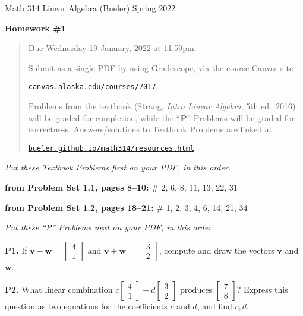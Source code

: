 \documentclass[12pt]{amsart}
\newcommand{\bv}{\mathbf{v}}
\newcommand{\bw}{\mathbf{w}}
\newcommand{\ds}{\displaystyle}
\newcommand{\prob}[1]{\bigskip\noindent\textbf{#1}\quad }
\newcommand{\probset}[2]{\prob{from Problem Set #1, pages #2:}}
\begin{document}
\scriptsize \noindent Math 314 Linear Algebra (Bueler) \hfill Spring 2022
\normalsize\medskip

\Large
\centerline{\textbf{Homework \#1}}

\normalsize
\bigskip
\begin{quote}
Due Wednesday 19 January, 2022 at 11:59pm.

\medskip
\noindent Submit as a single PDF by using Gradescope, via the course Canvas site

\href{https://canvas.alaska.edu/courses/7017}{\texttt{canvas.alaska.edu/courses/7017}}

\noindent Problems from the textbook (Strang, \emph{Intro Linear Algebra}, 5th ed.~2016) will be graded for completion, while the ``\textbf{P}'' Problems will be graded for correctness.  Answers/solutions to Textbook Problems are linked at

\href{https://bueler.github.io/math314/resources.html}{\texttt{bueler.github.io/math314/resources.html}}
\end{quote}
\medskip

\thispagestyle{empty}

\noindent \hrulefill

\noindent \emph{Put these Textbook Problems first on your PDF, in this order.}

\probset{1.1}{8--10} \# 2, 6, 8, 11, 13, 22, 31

\probset{1.2}{18--21} \# 1, 2, 3, 4, 6, 14, 21, 34

\bigskip
\noindent \hrulefill

\noindent \emph{Put these ``P'' Problems next on your PDF, in this order.}

\prob{P1.}  If $\ds \bv - \bw = \begin{bmatrix} 4 \\ 1 \end{bmatrix}$ and $\ds \bv + \bw = \begin{bmatrix} 3 \\ 2 \end{bmatrix}$, compute and draw the vectors $\bv$ and $\bw$.

\prob{P2.}  What linear combination $\ds c \begin{bmatrix} 4 \\ 1 \end{bmatrix} + d \begin{bmatrix} 3 \\ 2 \end{bmatrix}$ produces $\ds \begin{bmatrix} 7 \\ 8 \end{bmatrix}$?  Express this question as two equations for the coefficients $c$ and $d$, and find $c,d$.
\end{document}
